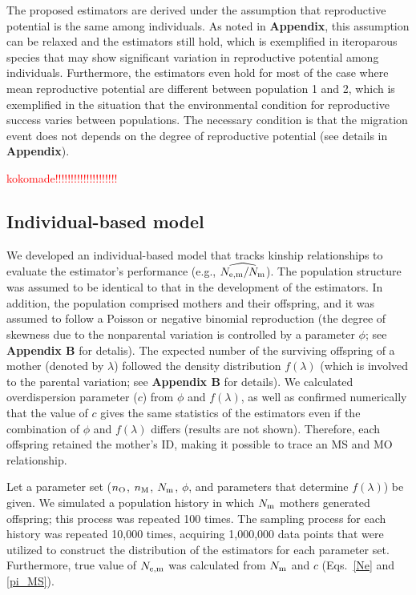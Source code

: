 \documentclass[12pt, English]{article}
\def\RED#1{\textcolor{red}{#1}} %
\begin{document}
\begin{spacing}{1.9}
The proposed estimators are derived under the assumption that reproductive potential is the same among individuals. As noted in {\bf Appendix}, this assumption can be relaxed and the estimators still hold, which is exemplified in iteroparous species that may show significant variation in reproductive potential among individuals. Furthermore, the estimators even hold for most of the case where mean reproductive potential are different between population 1 and 2, which is exemplified in the situation that the environmental condition for reproductive success varies between populations. The necessary condition is that the migration event does not depends on the degree of reproductive potential (see details in  {\bf Appendix}). 

\RED{kokomade!!!!!!!!!!!!!!!!!!!!}


\subsection{Individual-based model}

We developed an individual-based model that tracks kinship relationships to evaluate the estimator's performance (e.g., $\widehat{N_{\rm e,m}/N_{\rm m}}$). The population structure was assumed to be identical to that in the development of the estimators. In addition, the population comprised mothers and their offspring, and it was assumed to follow a Poisson or negative binomial reproduction (the degree of skewness due to the nonparental variation is controlled by a parameter $\phi$; see {\bf Appendix B} for detalis). The expected number of the surviving offspring of a mother (denoted by $\lambda$) followed the density distribution $f(\lambda)$ (which is involved to the parental variation; see {\bf Appendix B} for details). We calculated overdispersion parameter ($c$) from $\phi$ and $f(\lambda)$, as well as confirmed numerically that the value of $c$ gives the same statistics of the estimators even if the combination of $\phi$ and $f(\lambda)$ differs (results are not shown). Therefore, each offspring retained the mother's ID, making it possible to trace an MS and MO relationship.

Let a parameter set ($n_{\rm O}$, $n_{\rm M}$, $N_{\rm m}$, $\phi$, and parameters that determine $f(\lambda)$) be given. We simulated a population history in which $N_{\rm m}$ mothers generated offspring; this process was repeated 100 times. The sampling process for each history was repeated 10{,}000 times, acquiring 1{,}000{,}000 data points that were utilized to construct the distribution of the estimators for each parameter set. Furthermore, true value of $N_{\rm e,m}$ was calculated from $N_{\rm m}$ and $c$ (Eqs.~\ref{Ne} and \ref{pi_MS}).


\end{spacing}
\end{document}
